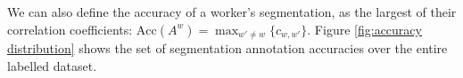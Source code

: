 We can also define the accuracy of a worker's segmentation, as the largest of their correlation coefficients: $\textrm{Acc}(A^{w})=\max_{w'\neq w} \{c_{w,w'}\}$. Figure \ref{fig:accuracy distribution} shows the set of segmentation annotation accuracies over the entire labelled dataset.



